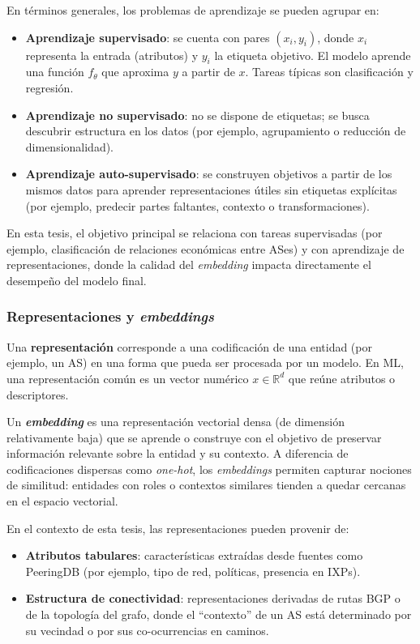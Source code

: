 En términos generales, los problemas de aprendizaje se pueden agrupar en:
\begin{itemize}
    \item \textbf{Aprendizaje supervisado}: se cuenta con pares $(x_i,y_i)$, donde $x_i$ representa la entrada (atributos) y $y_i$ la etiqueta objetivo. El modelo aprende una función $f_\theta$ que aproxima $y$ a partir de $x$. Tareas típicas son clasificación y regresión.
    \item \textbf{Aprendizaje no supervisado}: no se dispone de etiquetas; se busca descubrir estructura en los datos (por ejemplo, agrupamiento o reducción de dimensionalidad).
    \item \textbf{Aprendizaje auto-supervisado}: se construyen objetivos a partir de los mismos datos para aprender representaciones útiles sin etiquetas explícitas (por ejemplo, predecir partes faltantes, contexto o transformaciones).
\end{itemize}

En esta tesis, el objetivo principal se relaciona con tareas supervisadas (por ejemplo, clasificación de relaciones económicas entre ASes) y con aprendizaje de representaciones, donde la calidad del \textit{embedding} impacta directamente el desempeño del modelo final.

\subsubsection{Representaciones y \textit{embeddings}}

Una \textbf{representación} corresponde a una codificación de una entidad (por ejemplo, un AS) en una forma que pueda ser procesada por un modelo. En ML, una representación común es un vector numérico $x\in\mathbb{R}^d$ que reúne atributos o descriptores.

Un \textbf{\textit{embedding}} es una representación vectorial densa (de dimensión relativamente baja) que se aprende o construye con el objetivo de preservar información relevante sobre la entidad y su contexto. A diferencia de codificaciones dispersas como \textit{one-hot}, los \textit{embeddings} permiten capturar nociones de similitud: entidades con roles o contextos similares tienden a quedar cercanas en el espacio vectorial.

En el contexto de esta tesis, las representaciones pueden provenir de:
\begin{itemize}
    \item \textbf{Atributos tabulares}: características extraídas desde fuentes como PeeringDB (por ejemplo, tipo de red, políticas, presencia en IXPs).
    \item \textbf{Estructura de conectividad}: representaciones derivadas de rutas BGP o de la topología del grafo, donde el ``contexto'' de un AS está determinado por su vecindad o por sus co-ocurrencias en caminos.
\end{itemize}

